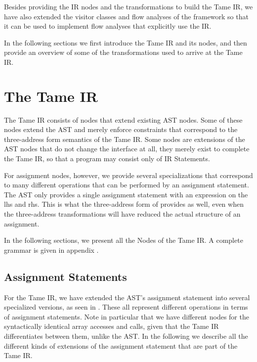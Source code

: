 Besides providing the IR nodes and the transformations to 
build the Tame IR, we have also extended the visitor classes and
flow analyses of the \mcsaf framework so that it can be used
to implement flow analyses that explicitly use the IR.

In the following sections we first introduce the Tame IR and its nodes,
and then provide an overview of some of the transformations used to
arrive at the Tame IR.


\section{The Tame IR}
The Tame IR consists of nodes that extend existing AST nodes.
Some of these nodes extend the AST and merely enforce 
constraints that correspond to the three-address form
semantics of the Tame IR. Some nodes are extensions of
the AST nodes that do not change the interface at all,
they merely exist to complete the Tame IR, so that
a program may consist only of IR Statements.

For assignment nodes, however, we provide several specializations
that correspond to many different operations that can be
performed by an assignment statement. The AST only provides
a single assignment statement with an expression on the lhs
and rhs. This is what the three-address form of \mcsaf
provides as well, even when the three-address transformations
will have reduced the actual structure of an assignment.


In the following sections, we present all the Nodes of the Tame IR.
A complete grammar is given in appendix .


\subsection{Assignment Statements}
\label{sec:assignStmts}
For the Tame IR, we have extended the AST's assignment statement into 
several specialized versions, as seen in 
. These all represent different operations
in terms of assignment statements. Note in particular that we have
different nodes for the syntactically identical array accesses and
calls, given that the Tame IR differentiates between them, unlike the
AST.  In the following we describe all the different kinds of
extensions of the assignment statement that are part of the Tame IR.

